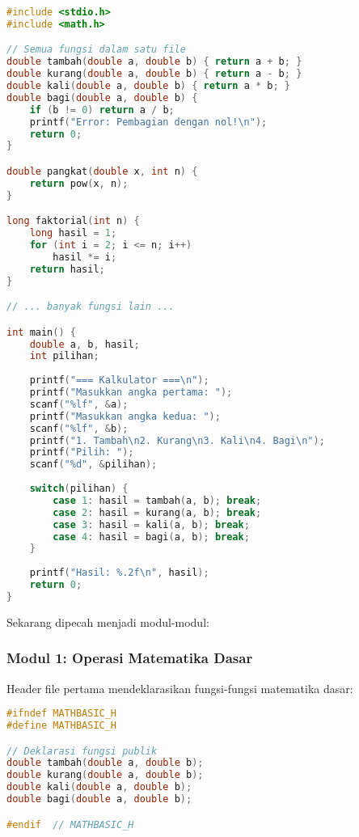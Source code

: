 \documentclass[../main.tex]{subfiles}
\begin{document}
\begin{lstlisting}[language=C, caption={kalkulator\_monolitik.c}]
#include <stdio.h>
#include <math.h>

// Semua fungsi dalam satu file
double tambah(double a, double b) { return a + b; }
double kurang(double a, double b) { return a - b; }
double kali(double a, double b) { return a * b; }
double bagi(double a, double b) {
    if (b != 0) return a / b;
    printf("Error: Pembagian dengan nol!\n");
    return 0;
}

double pangkat(double x, int n) {
    return pow(x, n);
}

long faktorial(int n) {
    long hasil = 1;
    for (int i = 2; i <= n; i++)
        hasil *= i;
    return hasil;
}

// ... banyak fungsi lain ...

int main() {
    double a, b, hasil;
    int pilihan;
    
    printf("=== Kalkulator ===\n");
    printf("Masukkan angka pertama: ");
    scanf("%lf", &a);
    printf("Masukkan angka kedua: ");
    scanf("%lf", &b);
    printf("1. Tambah\n2. Kurang\n3. Kali\n4. Bagi\n");
    printf("Pilih: ");
    scanf("%d", &pilihan);
    
    switch(pilihan) {
        case 1: hasil = tambah(a, b); break;
        case 2: hasil = kurang(a, b); break;
        case 3: hasil = kali(a, b); break;
        case 4: hasil = bagi(a, b); break;
    }
    
    printf("Hasil: %.2f\n", hasil);
    return 0;
}
\end{lstlisting}

Sekarang dipecah menjadi modul-modul:

\subsubsection{Modul 1: Operasi Matematika Dasar}

Header file pertama mendeklarasikan fungsi-fungsi matematika dasar:

\begin{lstlisting}[language=C, caption={mathbasic.h - header operasi dasar}]
#ifndef MATHBASIC_H
#define MATHBASIC_H

// Deklarasi fungsi publik
double tambah(double a, double b);
double kurang(double a, double b);
double kali(double a, double b);
double bagi(double a, double b);

#endif  // MATHBASIC_H
\end{lstlisting}
\end{document}
